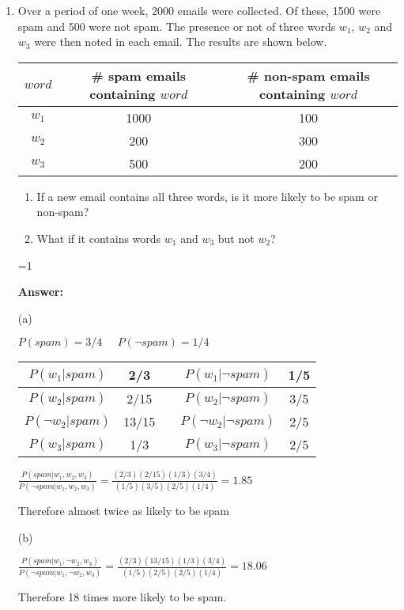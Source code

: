 \documentclass[12pt]{article}
\def\answers{1}
\newcommand{\answer}[1]{\ifnum\answers=1{{\bf Answer:} \it{#1}}\fi}
\begin{document}
\begin{enumerate}
\answer{
(a) $P(defective)=0.25*(0.05+0.4+0.1+0.1)=0.1625$

(b) $P(B2|def)=\frac{P(def|B2)P(B2)}{P(def)}=\frac{0.4\times 0.25}{0.1625}=0.615 (62\%)$
}

\item
Over a period of one week, 2000 emails were collected. Of these, 1500 were spam and 500 were not spam. The presence or not of three words $w_1$, $w_2$ and $w_3$ were then noted in each email. The results are shown below.
\vspace{2ex}

\begin{tabular}{|c|c|c|}\hline
$word$ & \# spam emails containing $word$ & \# non-spam emails containing $word$\\\hline
$w_1$ & 1000 & 100\\\hline
$w_2$ & 200 & 300\\\hline
$w_3$ & 500 & 200\\\hline
\end{tabular}
\vspace{2ex}

\begin{enumerate}
\item If a new email contains all three words, is it more likely to be spam or non-spam?
\item What if it contains words $w_1$ and $w_3$ but not $w_2$?
\end{enumerate}
 
\answer{
(a)

$P(spam)=3/4 \;\;\;\;\; P(\neg spam)=1/4$

\begin{tabular}{|c|c|c|c|c|}\hline
$P(w_1|spam)$ & 2/3   && $P(w_1|\neg spam)$ & 1/5\\\hline
$P(w_2|spam)$ & 2/15 && $P(w_2|\neg spam)$ & 3/5\\\hline
$P(\neg w_2|spam)$ & 13/15 && $P(\neg w_2|\neg spam)$ & 2/5\\\hline
$P(w_3|spam)$ & 1/3   && $P(w_3|\neg spam)$ & 2/5\\\hline
\end{tabular}

$\frac{P(spam|w_1,w_2,w_3)}{P(\neg spam|w_1,w_2,w_3)}=
\frac{(2/3)(2/15)(1/3)(3/4)}{(1/5)(3/5)(2/5)(1/4)}=1.85$

Therefore almost twice as likely to be spam

(b)

$\frac{P(spam|w_1,\neg w_2,w_3)}{P(\neg spam|w_1,\neg w_2,w_3)}=
\frac{(2/3)(13/15)(1/3)(3/4)}{(1/5)(2/5)(2/5)(1/4)}=18.06$


Therefore 18 times more likely to be spam.

}

\end{enumerate}
\end{document}
